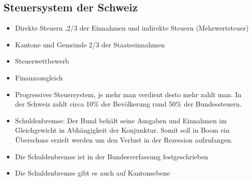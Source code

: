 \subsection{Steuersystem der Schweiz}
\begin{itemize}
	\item Direkte Steuern ,2/3 der Einnahmen und indirekte Steuern (Mehrwertsteuer)
	\item Kantone und Gemeinde 2/3 der Staatseinnahmen
	\item Steuerwettbewerb
	\item Finanzausgleich
	\item Progressives Steuersystem, je mehr man verdient desto mehr zahlt man. In der Schweiz zahlt circa 10\% der Bevölkerung rund 50\% der Bundessteuern. 
	\item Schuldenbremse: Der Bund behält seine Ausgaben und Einnahmen im Gleichgewicht in Abhängigkeit der Konjunktur. Somit soll in Boom ein Überschuss erzielt werden um den Verlust in der Rezession aufzufangen. 
	\item Die Schuldenbremse ist in der Bundesverfassung festgeschrieben
	\item Die Schuldenbremse gibt es auch auf Kantonsebene
\end{itemize}
\clearpage
\pagebreak